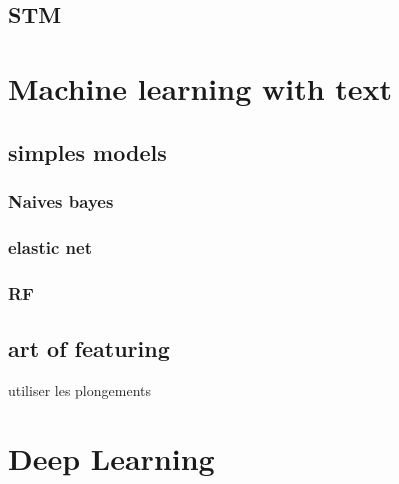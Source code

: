 \documentclass[
]{book}
\begin{document}
\hypertarget{stm}{%
\section{STM}\label{stm}}

\hypertarget{section}{%
\subsection{}\label{section}}

\hypertarget{section-1}{%
\subsection{}\label{section-1}}

\hypertarget{machine-learning-with-text}{%
\chapter{Machine learning with text}\label{machine-learning-with-text}}

\hypertarget{simples-models}{%
\section{simples models}\label{simples-models}}

\hypertarget{naives-bayes}{%
\subsection{Naives bayes}\label{naives-bayes}}

\hypertarget{elastic-net}{%
\subsection{elastic net}\label{elastic-net}}

\hypertarget{rf}{%
\subsection{RF}\label{rf}}

\hypertarget{art-of-featuring}{%
\section{art of featuring}\label{art-of-featuring}}

utiliser les plongements

\hypertarget{deep-learning}{%
\chapter{Deep Learning}\label{deep-learning}}
\end{document}
